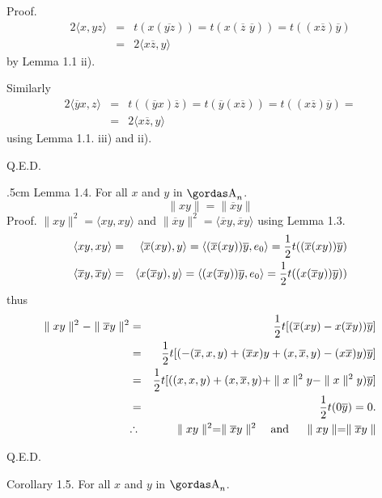 {\bsbf Proof.}
\begin{eqnarray*}
2\langle x,yz\rangle&=&t(x(\overline{yz}))=t(x(\overline{z}\,\,\overline{y}))=
t((x\overline{z})\overline{y})\\
&=&2\langle x\overline{z},y\rangle
\end{eqnarray*}
by Lemma 1.1 ii).
\par 
Similarly
\begin{eqnarray*}
2\langle\overline{y}x,z\rangle&=&t((\overline{y}x)\overline{z})=t(
\overline{y}(x\overline{z}))=t((x\overline{z})\overline{y})=\\
&=&2\langle x\overline{z},y\rangle
\end{eqnarray*}
using Lemma 1.1. iii) and ii).
\begin{flushright}
Q.E.D.
\end{flushright}
\vglue.5cm
\noindent
{\bsbf Lemma 1.4.} For all $x$ and $y$ in $\a_{n}$.
$$\parallel xy\parallel = \parallel\overline{x}y\parallel$$
{\bsbf Proof.} 
$\parallel xy\parallel^{2}=\langle xy,xy\rangle$ and
$\parallel\overline{x}y\parallel^{2}=\langle\overline{x}y,\overline{x}y\rangle$
using Lemma 1.3.
\begin{eqnarray*}
\langle xy,xy\rangle&=&\langle\overline{x}(xy),y\rangle=
\langle(\overline{x}(xy))\overline{y},e_{0}\rangle={ 1\over 2 }t((\overline{x}(xy))
\overline{y})\\
\langle\overline{x}y,\overline{x}y\rangle&=&\langle x(\overline{x}y),y\rangle=
\langle(x(\overline{x}y))\overline{y},e_{0}\rangle=
{ 1\over 2 }t((x(\overline{x}y))
\overline{y}))
\end{eqnarray*}
thus 
\begin{eqnarray*}
\parallel xy\parallel^{2}-\parallel\overline{x}y\parallel^{2}&=&
{ 1\over 2 }t[(\overline{x}(xy)-x(\overline{x}y))\overline{y}]\\
&=&{ 1\over 2 }t[(-(\overline{x},x,y)+(\overline{x}x)y+(x,\overline{x},y)-
(x\overline{x})y)\overline{y}]\\
&=&{ 1\over  2}t[((x,x,y)+(x,\overline{x},y)+\parallel x\parallel^{2}y-
\parallel x\parallel^{2}y)\overline{y}]\\
&=&{ 1\over 2 }t(0\overline{y})=0.\\
&\triangulo &\parallel xy\parallel^{2}=\parallel\overline{x}y\parallel^{2}\quad
\hbox{\bs and }\quad \parallel xy\parallel=\parallel\overline{x}y\parallel
\end{eqnarray*}
\begin{flushright}
Q.E.D.
\end{flushright}
{\bsbf Corollary 1.5.} For all $x$ and $y$ in $\a_{n}$.
